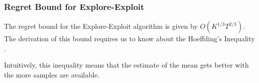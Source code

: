 \documentclass[11pt]{article}
\begin{document}
\subsubsection{Regret Bound for Explore-Exploit}
The regret bound for the Explore-Exploit algorithm is given by $O(K^{1/3} T^{2/3})$. The derivation of this bound
requires us to know about the Hoeffding's Inequality \cite{hoeffding1994probability}.


\normalfont
Intuitively, this inequality means that the estimate of the mean gets better with the more samples are available.


{


}


\end{document}
